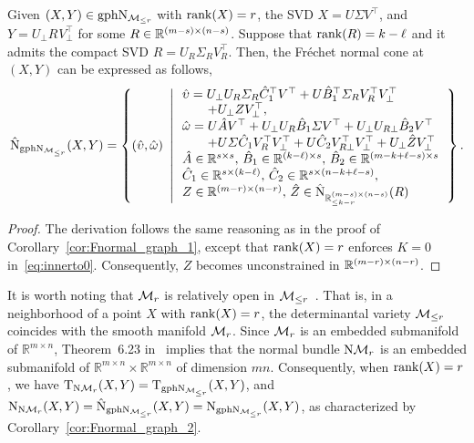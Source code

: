 \begin{corollary}\label{cor:Fnormal_graph_2}
    Given $(X,Y)\in\mathrm{gph}\mathrm{N}_{\mathcal{M}_{\le r}}$ with $\operatorname{rank}(X)=r$, the SVD $X=U\varSigma V^\top$, and $Y=U^{}_{\bot} R_{}^{}V_{\bot}^\top$ for some $R\in\mathbb{R}^{(m-s)\times (n-s)}$. Suppose that $\operatorname{rank}(R)=k-\ell$ and it admits the compact SVD $R=U_R\varSigma_RV_R^\top$. Then, the Fr\'echet normal cone at $(X,Y)$ can be expressed as follows,
    \begin{equation}\label{eq:Fnormal_graph_full}
        \hat{\mathrm{N}}_{\mathrm{gph}\mathrm{N}_{\mathcal{M}_{\le r}}}(X,Y)=\left\{ { (\hat{\upsilon},\hat{\omega})\ \left|\,\begin{array}{l}
            \hat{\upsilon} =  U_\bot U_R\varSigma_R\hat{C}_1^\top V^\top + U\hat{B}_1^\top \varSigma_RV_R^\top V_\bot^\top
            \\
            \hspace{7mm}+ U_\bot Z V^\top_\bot,
           \\
           \hat{\omega} = U\hat{A}V^\top + U_\bot U_R\hat{B}_1\varSigma V^\top + U_\bot U_{R\bot}\hat{B}_2 V^\top
           \\
           \hspace{7mm}+ U \varSigma\hat{C}_1V_R^\top V_\bot^\top+ U \hat{C}_2V_{R\bot}^\top V_\bot^\top +U_\bot\hat{Z} V_\bot^\top 
            \\
            \hat{A}\in\mathbb{R}^{s\times s},\,\hat{B}_1\in\mathbb{R}^{(k-\ell)\times s},\,\hat{B}_2\in\mathbb{R}^{(m-k+\ell-s)\times s}
            \\
            \hat{C}_1\in\mathbb{R}^{s\times (k-\ell)},\,\hat{C}_2\in\mathbb{R}^{s\times(n-k+\ell-s)},
            \\
            Z\in\mathbb{R}^{(m-r)\times(n-r)},\,\hat{Z}\in\hat{\mathrm{N}}_{\mathbb{R}^{(m-s)\times(n-s)}_{\le k-r}}(R)
        \end{array} \right.
        } \right\}.
    \end{equation}
\end{corollary}
\begin{proof}
The derivation follows the same reasoning as in the proof of Corollary~\ref{cor:Fnormal_graph_1}, except that $\operatorname{rank}(X)=r$ enforces $K=0$ in~\eqref{eq:innerto0}. Consequently, $Z$ becomes unconstrained in $\mathbb{R}^{(m-r)\times(n-r)}$.
\end{proof}

It is worth noting that $\mathcal{M}_{r}$ is relatively open in $\mathcal{M}_{\le r}$~\cite{olikier2022continuity}. That is, in a neighborhood of a point $X$ with $\operatorname{rank}(X)=r$, the determinantal variety $\mathcal{M}_{\le r}$ coincides with the smooth manifold $\mathcal{M}_{r}$. Since $\mathcal{M}_{r}$ is an embedded submanifold of $\mathbb{R}^{m\times n}$, Theorem~6.23 in~\cite{lee2012manifolds} implies that the normal bundle $\mathrm{N}\mathcal{M}_{r}$ is an embedded submanifold of $\mathbb{R}^{m\times n}\times\mathbb{R}^{m\times n}$ of dimension $mn$. Consequently, when $\operatorname{rank}(X)=r$, we have $\mathrm{T}_{\mathrm{N} \mathcal{M}_{r}}(X,Y) = \mathrm{T}_{\mathrm{gph}\mathrm{N}_{\mathcal{M}_{\le r}}}(X,Y)$, and $\mathrm{N}_{\mathrm{N} \mathcal{M}_{r}}(X,Y) = \hat{\mathrm{N}}_{\mathrm{gph}\mathrm{N}_{\mathcal{M}_{\le r}}}(X,Y) = \mathrm{N}_{\mathrm{gph}\mathrm{N}_{\mathcal{M}_{\le r}}}(X,Y)$, as characterized by Corollary~\ref{cor:Fnormal_graph_2}.


